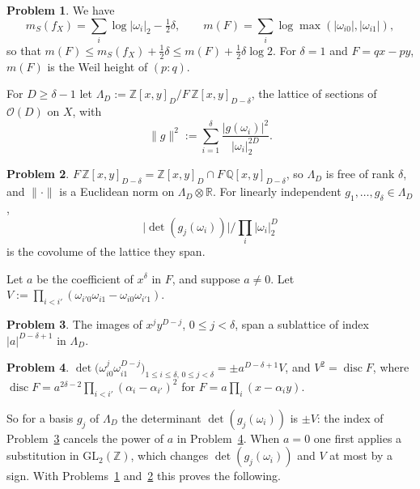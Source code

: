 \documentclass[reqno]{amsart}
\theoremstyle{definition}
\newtheorem{problem}{Problem}[section]
\theoremstyle{plain}
\newcommand{\Z}{\mathbb{Z}}
\newcommand{\Q}{\mathbb{Q}}
\newcommand{\R}{\mathbb{R}}
\newcommand{\disc}{\operatorname{disc}}
\newcommand{\mS}{m_{S}}
\begin{document}
\begin{problem}\label{pr:point}
We have
\[
  \mS(f_X) = \sum_i \log\lvert\omega_i\rvert_2 - \tfrac12\delta , \qquad m(F) = \sum_i \log\max(\lvert\omega_{i0}\rvert, \lvert\omega_{i1}\rvert) ,
\]
so that \(m(F) \le \mS(f_X) + \tfrac12\delta \le m(F) + \tfrac12\delta\log 2\).  For \(\delta = 1\) and \(F = qx - py\), \(m(F)\) is the Weil height of \((p : q)\).
\end{problem}

For \(D \ge \delta - 1\) let \(\Lambda_D := \Z[x,y]_D / F\,\Z[x,y]_{D-\delta}\), the lattice of sections of \(\mathcal O(D)\) on \(X\), with
\[
  \lVert g \rVert^2 := \sum_{i=1}^{\delta} \frac{\lvert g(\omega_i) \rvert^2}{\lvert\omega_i\rvert_2^{2D}} .
\]

\begin{problem}\label{pr:quotient0}
\(F\,\Z[x,y]_{D-\delta} = \Z[x,y]_D \cap F\,\Q[x,y]_{D-\delta}\), so \(\Lambda_D\) is free of rank \(\delta\), and \(\lVert\cdot\rVert\) is a Euclidean norm on \(\Lambda_D \otimes \R\).  For linearly independent \(g_1, \dots, g_\delta \in \Lambda_D\),
\[
  \lvert\det(g_j(\omega_i))\rvert \big/ \textstyle\prod_i \lvert\omega_i\rvert_2^{D}
\]
is the covolume of the lattice they span.
\end{problem}

Let \(a\) be the coefficient of \(x^\delta\) in \(F\), and suppose \(a \ne 0\).  Let \(V := \prod_{i < i'} (\omega_{i'0}\omega_{i1} - \omega_{i0}\omega_{i'1})\).

\begin{problem}\label{pr:index0}
The images of \(x^jy^{D-j}\), \(0 \le j < \delta\), span a sublattice of index \(\lvert a \rvert^{D-\delta+1}\) in \(\Lambda_D\).
\end{problem}

\begin{problem}\label{pr:vdm}
\(\det\bigl(\omega_{i0}^{j}\omega_{i1}^{D-j}\bigr)_{1 \le i \le \delta,\, 0 \le j < \delta} = \pm a^{D-\delta+1} V\), and \(V^2 = \disc F\), where \(\disc F = a^{2\delta-2}\prod_{i<i'}(\alpha_i - \alpha_{i'})^2\) for \(F = a\prod_i (x - \alpha_i y)\).
\end{problem}

So for a basis \(g_j\) of \(\Lambda_D\) the determinant \(\det(g_j(\omega_i))\) is \(\pm V\): the index of Problem~\ref{pr:index0} cancels the power of \(a\) in Problem~\ref{pr:vdm}.  When \(a = 0\) one first applies a substitution in \(\mathrm{GL}_2(\Z)\), which changes \(\det(g_j(\omega_i))\) and \(V\) at most by a sign.  With Problems~\ref{pr:point} and~\ref{pr:quotient0} this proves the following.
\end{document}
